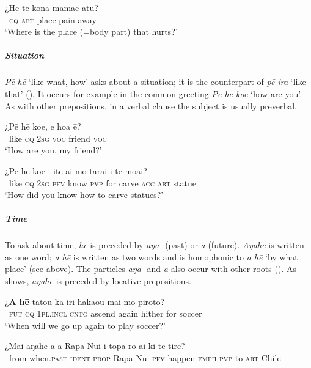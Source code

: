 \ea\label{ex:10.60}
\gll ¿Hē te kona mamae atu?\\
~\textsc{cq} \textsc{art} place pain away\\

\glt 
‘Where is the place (=body part) that hurts?’ \textstyleExampleref{[R481.100]} 
\z

\subparagraph{Situation} \textit{Pē} \textit{hē} ‘like what, how’ asks about a situation; it is the  counterpart of \textit{pē ira} ‘like that’ (). It occurs for example in the common greeting \textit{Pē hē koe} ‘how are you’. As with other prepositions, in a verbal clause the subject is usually preverbal. 

\ea\label{ex:10.61}
\gll ¿Pē hē koe, e hoa ē? \\
~like \textsc{cq} \textsc{2sg} \textsc{voc} friend \textsc{voc} \\

\glt 
‘How are you, my friend?’ \textstyleExampleref{[R237.116]} 
\z

\ea\label{ex:10.62}
\gll ¿Pē hē koe i {\ꞌ}ite ai mo tarai i te mōai? \\
~like \textsc{cq} \textsc{2sg} \textsc{pfv} know \textsc{pvp} for carve \textsc{acc} \textsc{art} statue \\

\glt 
‘How did you know how to carve statues?’ \textstyleExampleref{[R647.063]} 
\z

\subparagraph{Time} To ask about time, \textit{hē} is preceded by \textit{{\ꞌ}aŋa-} (past) or \textit{a} (future). \textit{{\ꞌ}Aŋahē} is written as one word; \textit{a hē} is written as two words and is homophonic to \textit{a hē} ‘by what place’ (see  above). The particles \textit{{\ꞌ}aŋa-} and \textit{a} also occur with other roots (). As  shows, \textit{{\ꞌ}aŋahe} is preceded by locative prepositions.

\ea\label{ex:10.63}
\gll ¿\textbf{A} \textbf{hē} tātou ka iri haka{\ꞌ}ou mai mo piroto? \\
~\textsc{fut} \textsc{cq} \textsc{1pl.incl} \textsc{cntg} ascend again hither for soccer \\

\glt 
‘When will we go up again to play soccer?’ \textstyleExampleref{[R155.007]} 
\z

\ea\label{ex:10.64}
\gll ¿Mai {\ꞌ}aŋahē {\ꞌ}ā a Rapa Nui i topa rō ai ki te tire? \\
~from when.\textsc{past} \textsc{ident} \textsc{prop} Rapa Nui \textsc{pfv} happen \textsc{emph} \textsc{pvp} to \textsc{art} Chile \\

